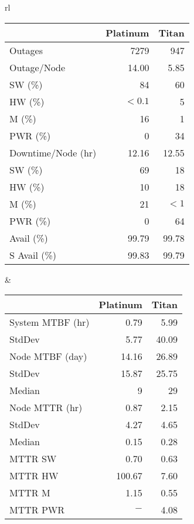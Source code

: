 \documentclass[10pt,twocolumn]{article}
\begin{document}
\begin{table*}
\begin{center}

\small{

\begin{tabular}{rl}

 \begin{tabular}{|l|r|r|}
 \hline
              & Platinum   & Titan  \\
 \hline
 Outages      &  7279     &  947   \\
 Outage/Node  &   14.00  &   5.85 \\
 SW (\%)  &  84       &  60   \\
 HW (\%)  &  $<0.1$   &   5   \\
 M  (\%)  &  16       &   1   \\
 PWR (\%) &  0        &  34   \\
 \hline
 Downtime/Node (hr) &  12.16 &   12.55   \\
 SW (\%)  &  69       &  18   \\
 HW (\%)  &  10       &  18   \\
 M  (\%)  &  21       &  $<1$ \\
 PWR (\%) &  0        &  64   \\
 \hline
 Avail (\%)    &  99.79 & 99.78 \\
 \hline
 S Avail (\%)  &  99.83 & 99.79 \\
 \hline
 \end{tabular}

&

 \begin{tabular}{|l|r|r|}
 \hline
              & Platinum   & Titan  \\
 \hline
 System MTBF (hr) &  0.79   &  5.99 \\
 StdDev      &  5.77       &  40.09 \\
 \hline
 Node  MTBF (day)  &  14.16  &  26.89 \\
 StdDev      & 15.87       &  25.75 \\
 Median      &  9          &   29   \\
 \hline
 Node MTTR (hr) &  0.87  & 2.15 \\
 StdDev      &  4.27       & 4.65  \\
 Median      &  0.15       & 0.28  \\
 \hline
 MTTR SW     &  0.70     & 0.63  \\
 MTTR HW     &  100.67   & 7.60  \\
 MTTR M      &  1.15     & 0.55  \\
 MTTR PWR    &  $-$      & 4.08  \\
 \hline
 \end{tabular}

\end{tabular}

}


\caption{Platinum and Titan Failure Data Summary}
\label{tbl:failuredataPT}
\end{center}
\end{table*}
\end{document}
